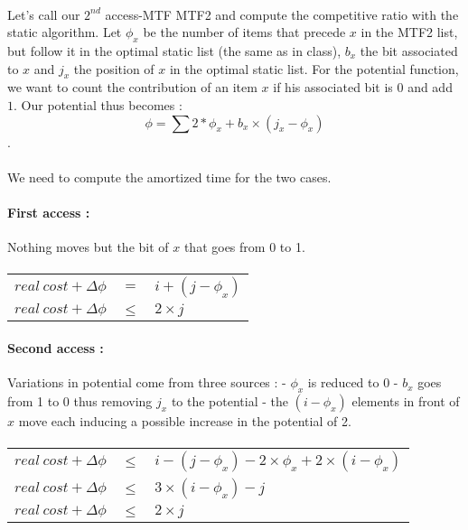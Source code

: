 \paragraph{}
Let's call our $2^{nd}$ access-MTF MTF2 and compute the competitive ratio with the static algorithm. Let $\phi_x$ be the number of items that precede $x$ in the MTF2 list, but follow it in the optimal static list (the same as in class), $b_x$ the bit associated to $x$ and $j_x$ the position of $x$ in the optimal static list. For the potential function, we want to count the contribution of an item $x$ if his associated bit is $0$ and add  $1$. Our potential thus becomes :
\[ \phi = \sum{} 2*\phi_x + b_x \times (j_x - \phi_x) \].

\paragraph{}We need to compute the amortized time for the two cases.

\paragraph{First access :} Nothing moves but the bit of $x$ that goes from 0 to 1.
\paragraph{}
\begin{tabular}{rcl}
$ real\ cost + \Delta\phi $&$ = $&$ i + (j - \phi_x) $\\
$ real\ cost + \Delta\phi $&$ \leq $&$ 2 \times j $\\
\end{tabular}

\paragraph{Second access :} Variations in potential come from three sources : - $\phi_x$ is reduced to 0 - $b_x$ goes from 1 to 0 thus removing $j_x$ to the potential - the $(i-\phi_x)$ elements in front of $x$ move each inducing a possible increase in the potential of 2.
\paragraph{}
\begin{tabular}{rcl}
$ real\ cost + \Delta\phi $&$ \leq $&$ i - (j - \phi_x) - 2 \times \phi_x + 2 \times (i - \phi_x) $\\
$ real\ cost + \Delta\phi $&$ \leq $&$ 3 \times (i - \phi_x) - j $\\
$ real\ cost + \Delta\phi $&$ \leq $&$ 2 \times j $\\
\end{tabular}

